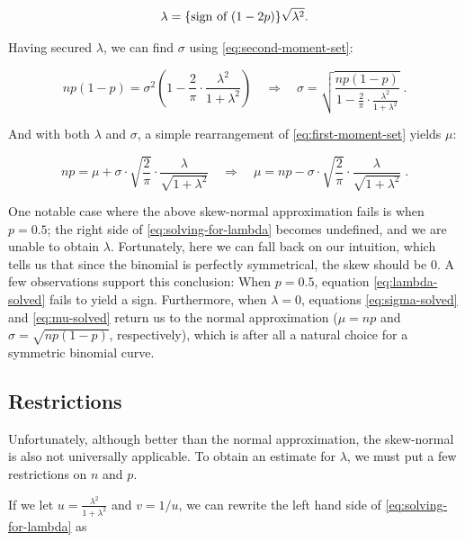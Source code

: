 \documentclass{article}
\begin{document}
\begin{equation}
  \label{eq:lambda-solved}
  \lambda = \textnormal{\{sign of $(1-2p)$\}} \sqrt{\lambda^2}.
\end{equation}

Having secured $\lambda$, we can find $\sigma$ using
\eqref{eq:second-moment-set}:

\begin{equation}
  \label{eq:sigma-solved}
  np(1-p) = \sigma^2 \left( 1 - \frac{2}{\pi} \cdot \frac{\lambda^2}{1 + \lambda^2} \right) \quad\Rightarrow\quad
  \sigma = \sqrt{\frac{np(1-p)}{1 - \frac{2}{\pi} \cdot \frac{\lambda^2}{1 + \lambda^2}}} \;.
\end{equation}

And with both $\lambda$ and $\sigma$, a simple rearrangement of
\eqref{eq:first-moment-set} yields $\mu$:

\begin{equation}
  \label{eq:mu-solved}
  np = \mu + \sigma \cdot \sqrt{\frac{2}{\pi}} \cdot \frac{\lambda}{\sqrt{1 + \lambda^2}} \quad\Rightarrow\quad
  \mu = np - \sigma \cdot \sqrt{\frac{2}{\pi}} \cdot \frac{\lambda}{\sqrt{1 + \lambda^2}} \;.
\end{equation}

One notable case where the above skew-normal approximation fails is when $p =
0.5$; the right side of \eqref{eq:solving-for-lambda} becomes undefined, and we
are unable to obtain $\lambda$. Fortunately, here we can fall back on our
intuition, which tells us that since the binomial is perfectly symmetrical, the
skew should be 0. A few observations support this conclusion: When $p = 0.5$,
equation \eqref{eq:lambda-solved} fails to yield a sign. Furthermore, when
$\lambda = 0$, equations \eqref{eq:sigma-solved} and \eqref{eq:mu-solved}
return us to the normal approximation ($\mu = np$ and $\sigma =
\sqrt{np(1-p)}$, respectively), which is after all a natural choice for a
symmetric binomial curve.

\subsection{Restrictions}

Unfortunately, although better than the normal approximation, the skew-normal
is also not universally applicable. To obtain an estimate for $\lambda$, we
must put a few restrictions on $n$ and $p$.

If we let $u = \frac{\lambda^2}{1+\lambda^2}$ and $v = 1/u$, we can rewrite the
left hand side of \eqref{eq:solving-for-lambda} as
\end{document}
